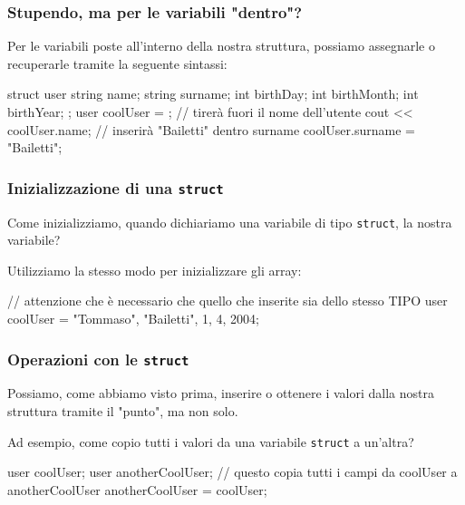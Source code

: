 \documentclass{beamer}
\begin{document}
    \begin{frame}[fragile]
        \frametitle{Stupendo, ma per le variabili "dentro"?}
    
        Per le variabili poste all'interno della nostra struttura, possiamo assegnarle o recuperarle tramite la seguente sintassi:
        
        \begin{cppcode}
            struct user {
                string name;
                string surname;
                int birthDay;
                int birthMonth;
                int birthYear;
            };
            user coolUser = {};
            // tirerà fuori il nome dell'utente
            cout << coolUser.name;
            // inserirà "Bailetti" dentro surname
            coolUser.surname = "Bailetti";
        \end{cppcode}
    
    \end{frame}

    \begin{frame}[fragile]
        \frametitle{Inizializzazione di una \texttt{struct}}
    
        Come inizializziamo, quando dichiariamo una variabile di tipo \texttt{struct}, la nostra variabile?

        Utilizziamo la stesso modo per inizializzare gli array:
        \begin{cppcode}
            // attenzione che è necessario che quello che inserite sia dello stesso TIPO
            user coolUser = {"Tommaso", "Bailetti", 1, 4, 2004};
        \end{cppcode}
    
    \end{frame}

    \begin{frame}[fragile]
        \frametitle{Operazioni con le \texttt{struct}}
    
        Possiamo, come abbiamo visto prima, inserire o ottenere i valori dalla nostra struttura tramite il "punto", ma non solo.
        
        Ad esempio, come copio tutti i valori da una variabile \texttt{struct} a un'altra?
        
        \begin{cppcode}
            user coolUser;
            user anotherCoolUser;
            // questo copia tutti i campi da coolUser a anotherCoolUser
            anotherCoolUser = coolUser;
        \end{cppcode}
    
    \end{frame}
\end{document}
